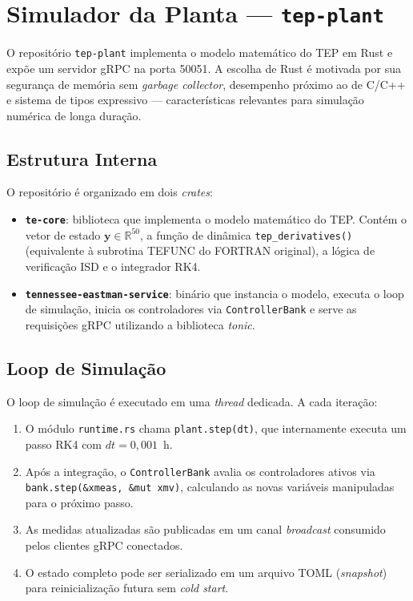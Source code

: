 \section{Simulador da Planta — \texttt{tep-plant}}
\label{sec:plant}

O repositório \texttt{tep-plant} implementa o modelo matemático do TEP em Rust e expõe um servidor gRPC na porta 50051. A escolha de Rust é motivada por sua segurança de memória sem \textit{garbage collector}, desempenho próximo ao de C/C++ e sistema de tipos expressivo — características relevantes para simulação numérica de longa duração.

\subsection{Estrutura Interna}

O repositório é organizado em dois \textit{crates}:

\begin{itemize}
  \item \textbf{\texttt{te-core}}: biblioteca que implementa o modelo matemático do TEP. Contém o vetor de estado $\mathbf{y} \in \mathbb{R}^{50}$, a função de dinâmica \texttt{tep\_derivatives()} (equivalente à subrotina TEFUNC do FORTRAN original), a lógica de verificação ISD e o integrador RK4.
  \item \textbf{\texttt{tennessee-eastman-service}}: binário que instancia o modelo, executa o loop de simulação, inicia os controladores via \texttt{ControllerBank} e serve as requisições gRPC utilizando a biblioteca \textit{tonic}.
\end{itemize}

\subsection{Loop de Simulação}

O loop de simulação é executado em uma \textit{thread} dedicada. A cada iteração:

\begin{enumerate}
  \item O módulo \texttt{runtime.rs} chama \texttt{plant.step(dt)}, que internamente executa um passo RK4 com $dt = 0{,}001$~h.
  \item Após a integração, o \texttt{ControllerBank} avalia os controladores ativos via \texttt{bank.step(\&xmeas, \&mut xmv)}, calculando as novas variáveis manipuladas para o próximo passo.
  \item As medidas atualizadas são publicadas em um canal \textit{broadcast} consumido pelos clientes gRPC conectados.
  \item O estado completo pode ser serializado em um arquivo TOML (\textit{snapshot}) para reinicialização futura sem \textit{cold start}.
\end{enumerate}

